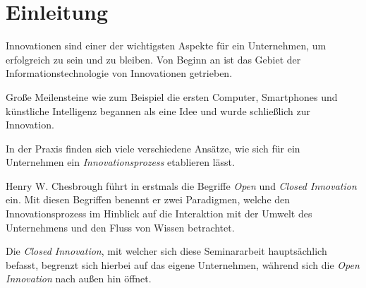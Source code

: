 \section{Einleitung}\label{sec:einleitung}

Innovationen sind einer der wichtigsten Aspekte für ein Unternehmen,
um erfolgreich zu sein und zu bleiben.
Von Beginn an ist das Gebiet der Informationstechnologie von Innovationen getrieben.

Große Meilensteine wie zum Beispiel die ersten Computer, Smartphones
und künstliche Intelligenz begannen als eine Idee und wurde schließlich zur Innovation.

In der Praxis finden sich viele verschiedene Ansätze,
wie sich für ein Unternehmen ein \textit{Innovationsprozess} etablieren lässt.

Henry W. Chesbrough führt in \cite{chesbrough2003} erstmals die Begriffe \textit{Open} und
\textit{Closed Innovation} ein.
Mit diesen Begriffen benennt er zwei Paradigmen, welche den Innovationsprozess im Hinblick auf die
Interaktion mit der Umwelt des Unternehmens und den Fluss von Wissen betrachtet.

Die \textit{Closed Innovation}, mit welcher sich diese Seminararbeit hauptsächlich befasst,
begrenzt sich hierbei auf das eigene Unternehmen, während sich die \textit{Open Innovation}
nach außen hin öffnet.